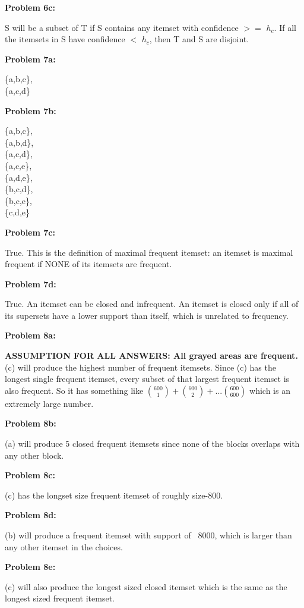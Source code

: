 \documentclass[11pt]{article}
\numberwithin{equation}{section}  %
\begin{document}
\noindent\textbf{Problem 6c: }

\noindent S will be a subset of T if S contains any itemset with confidence $>=$ $h_c$. If all the itemsets in S have confidence $<$ $h_c$, then T and S are disjoint.
\vspace*{0.25in}

\noindent\textbf{Problem 7a: }

\noindent \{a,b,c\},\\
\{a,c,d\}
\vspace*{0.25in}

\noindent\textbf{Problem 7b: }

\noindent \{a,b,c\},\\
\{a,b,d\},\\
\{a,c,d\},\\
\{a,c,e\},\\
\{a,d,e\},\\
\{b,c,d\},\\
\{b,c,e\},\\
\{c,d,e\}
\vspace*{0.25in}

\noindent\textbf{Problem 7c: }

\noindent True. This is the definition of maximal frequent itemset: an itemset is maximal frequent if NONE of its itemsets are frequent.
\vspace*{0.25in}

\noindent\textbf{Problem 7d: }

\noindent True. An itemset can be closed and infrequent. An itemset is closed only if all of its supersets have a lower support than itself, which is unrelated to frequency.
\vspace*{0.25in}

\noindent\textbf{Problem 8a: }

\noindent \textbf{ASSUMPTION FOR ALL ANSWERS: All grayed areas are frequent.} (c) will produce the highest number of frequent itemsets. Since (c) has the longest single frequent itemset, every subset of that largest frequent itemset is also frequent. So it has something like $\binom{600}{1}+\binom{600}{2}+...\binom{600}{600}$ which is an extremely large number.
\vspace*{0.25in}

\noindent\textbf{Problem 8b: }

\noindent (a) will produce 5 closed frequent itemsets since none of the blocks overlaps with any other block.
\vspace*{0.25in}

\noindent\textbf{Problem 8c: }

\noindent (c) has the longset size frequent itemset of roughly size-800.
\vspace*{0.25in}

\noindent\textbf{Problem 8d: }

\noindent (b) will produce a frequent itemset with support of ~8000, which is larger than any other itemset in the choices.
\vspace*{0.25in}

\noindent\textbf{Problem 8e: }

\noindent (c) will also produce the longest sized closed itemset which is the same as the longest sized frequent itemset.
\vspace*{0.25in}
\end{document}
